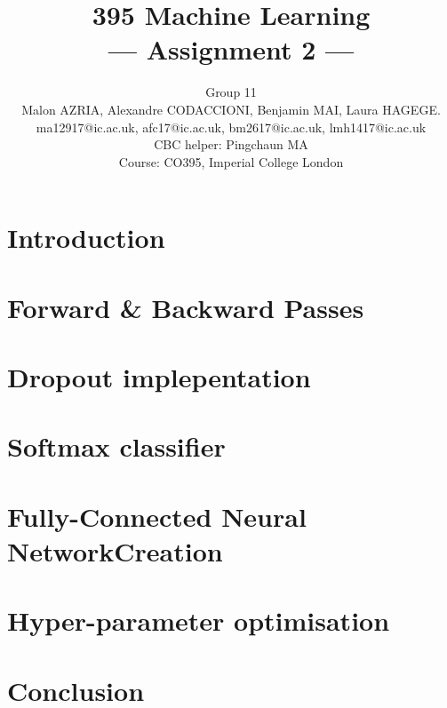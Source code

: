 \documentclass[a4paper,11pt]{article}
\title{395 Machine Learning\\\Large{--- Assignment 2 ---}}
\author{Group 11\\Malon AZRIA, Alexandre CODACCIONI, Benjamin MAI,
  Laura HAGEGE.\\
  ma12917@ic.ac.uk, afc17@ic.ac.uk, bm2617@ic.ac.uk, lmh1417@ic.ac.uk \\
       \small{CBC helper: Pingchaun MA}\\
       \small{Course: CO395, Imperial College London}
}
\begin{document}
\maketitle

\section{Introduction}
    

\section{Forward \& Backward Passes}
    

\section{Dropout implepentation}
    
 
    
\section{Softmax classifier}
    

\section{Fully-Connected Neural NetworkCreation}
     


\section{Hyper-parameter optimisation}
	

      
\section{Conclusion}
    
\end{document}
